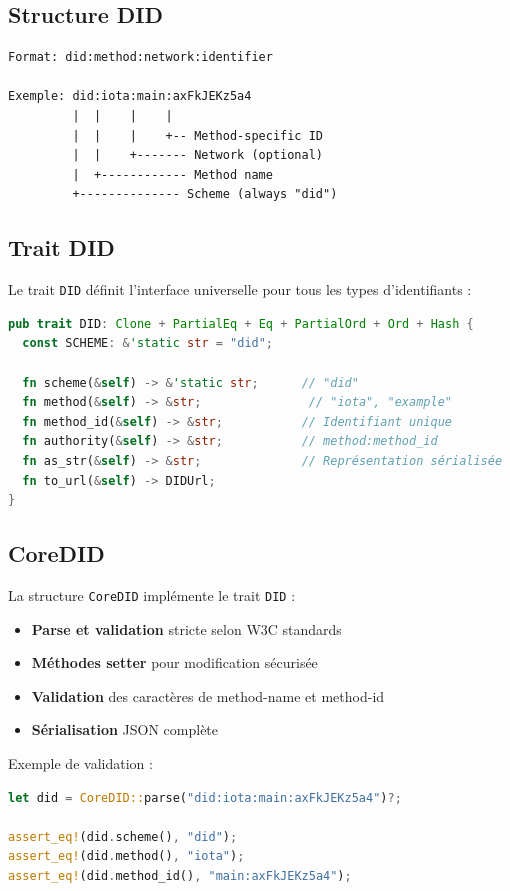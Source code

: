 \documentclass[12pt,a4paper]{report}
\begin{document}
\subsection{Structure DID}

\begin{lstlisting}
Format: did:method:network:identifier

Exemple: did:iota:main:axFkJEKz5a4
         |  |    |    |
         |  |    |    +-- Method-specific ID
         |  |    +------- Network (optional)
         |  +------------ Method name  
         +-------------- Scheme (always "did")
\end{lstlisting}

\subsection{Trait DID}

Le trait \texttt{DID} définit l'interface universelle pour tous les types d'identifiants :

\begin{lstlisting}[language=Rust]
pub trait DID: Clone + PartialEq + Eq + PartialOrd + Ord + Hash {
  const SCHEME: &'static str = "did";
  
  fn scheme(&self) -> &'static str;      // "did"
  fn method(&self) -> &str;               // "iota", "example"
  fn method_id(&self) -> &str;           // Identifiant unique
  fn authority(&self) -> &str;           // method:method_id
  fn as_str(&self) -> &str;              // Représentation sérialisée
  fn to_url(&self) -> DIDUrl;
}
\end{lstlisting}

\subsection{CoreDID}

La structure \texttt{CoreDID} implémente le trait \texttt{DID} :

\begin{itemize}
  \item \textbf{Parse et validation} stricte selon W3C standards
  \item \textbf{Méthodes setter} pour modification sécurisée
  \item \textbf{Validation} des caractères de method-name et method-id
  \item \textbf{Sérialisation} JSON complète
\end{itemize}

Exemple de validation :
\begin{lstlisting}[language=Rust]
let did = CoreDID::parse("did:iota:main:axFkJEKz5a4")?;

assert_eq!(did.scheme(), "did");
assert_eq!(did.method(), "iota");
assert_eq!(did.method_id(), "main:axFkJEKz5a4");
\end{lstlisting}
\end{document}
